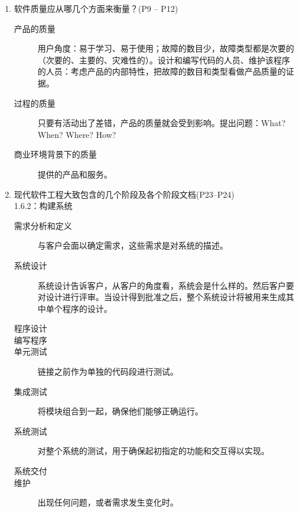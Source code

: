 \documentclass[14pt, letterpaper, UTF8, fontset=windowsnew, heading=true]{article}
\begin{document}
\begin{enumerate}
	\item 软件质量应从哪几个方面来衡量？(P9 -- P12)
	\begin{description}
		\item[产品的质量] 用户角度：易于学习、易于使用；故障的数目少，故障类型都是次要的（次要的、主要的、灾难性的）。设计和编写代码的人员、维护该程序的人员：考虑产品的内部特性，把故障的数目和类型看做产品质量的证据。
		\item[过程的质量] 只要有活动出了差错，产品的质量就会受到影响。提出问题：What? When? Where? How?
		\item[商业环境背景下的质量] 提供的产品和服务。
	\end{description}


	\item 现代软件工程大致包含的几个阶段及各个阶段文档(P23--P24) \\
	1.6.2：构建系统
	\begin{description}
		\item[需求分析和定义] 与客户会面以确定需求，这些需求是对系统的描述。
		\item[系统设计] 系统设计告诉客户，从客户的角度看，系统会是什么样的。然后客户要对设计进行评审。当设计得到批准之后，整个系统设计将被用来生成其中单个程序的设计。
		\item[程序设计] 
		\item[编写程序]
		\item[单元测试] 链接之前作为单独的代码段进行测试。
		\item[集成测试] 将模块组合到一起，确保他们能够正确运行。
		\item[系统测试] 对整个系统的测试，用于确保起初指定的功能和交互得以实现。
		\item[系统交付] 
		\item[维护] 出现任何问题，或者需求发生变化时。
	\end{description}


\end{enumerate}
\end{document}
